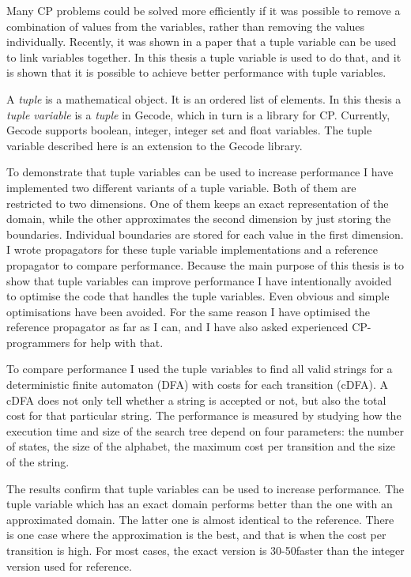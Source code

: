 \documentclass[a4paper,11pt]{article}
\begin{document}
Many CP problems could be solved more efficiently if it was possible to remove a combination of values from the variables, rather than removing the values individually. Recently, it was shown in a paper\cite{Monette771427} that a tuple variable can be used to link variables together. In this thesis a tuple variable is used to do that, and it is shown that it is possible to achieve better performance with tuple variables. 

A \textit{tuple} is a mathematical object. It is an ordered list of elements. In this thesis a \textit{tuple variable} is a \textit{tuple} in Gecode, which in turn is a library for CP. Currently, Gecode supports boolean, integer, integer set and float variables. The tuple variable described here is an extension to the Gecode library.

To demonstrate that tuple variables can be used to increase performance I have implemented two different variants of a tuple variable. Both of them are restricted to two dimensions. One of them keeps an exact representation of the domain, while the other approximates the second dimension by just storing the boundaries. Individual boundaries are stored for each value in the first dimension. I wrote propagators for these tuple variable implementations and a reference propagator to compare performance. Because the main purpose of this thesis is to show that tuple variables can improve performance I have intentionally avoided to optimise the code that handles the tuple variables. Even obvious and simple optimisations have been avoided. For the same reason I have optimised the reference propagator as far as I can, and I have also asked experienced CP-programmers for help with that.

To compare performance I used the tuple variables to find all valid strings for a deterministic finite automaton (DFA) with costs for each transition (cDFA). A cDFA does not only tell whether a string is accepted or not, but also the total cost for that particular string. The performance is measured by studying how the execution time and size of the search tree depend on four parameters: the number of states, the size of the alphabet, the maximum cost per transition and the size of the string.

The results confirm that tuple variables can be used to increase performance. The tuple variable which has an exact domain performs better than the one with an approximated domain. The latter one is almost identical to the reference. There is one case where the approximation is the best, and that is when the cost per transition is high. For most cases, the exact version is 30-50\percent faster than the integer version used for reference.
\end{document}
